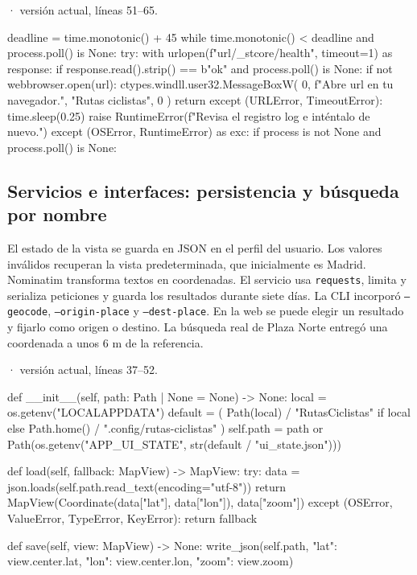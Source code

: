 \documentclass[11pt,a4paper]{article}
\begin{document}
\smallskip
{\footnotesize\texttt{} · versión actual, líneas 51--65.}\par
\begin{Codigo}[firstnumber=51]
        deadline = time.monotonic() + 45
        while time.monotonic() < deadline and process.poll() is None:
            try:
                with urlopen(f"{url}/_stcore/health", timeout=1) as response:
                    if response.read().strip() == b"ok" and process.poll() is None:
                        if not webbrowser.open(url):
                            ctypes.windll.user32.MessageBoxW(
                                0, f"Abre {url} en tu navegador.", "Rutas ciclistas", 0
                            )
                        return
            except (URLError, TimeoutError):
                time.sleep(0.25)
        raise RuntimeError(f"Revisa el registro {log} e inténtalo de nuevo.")
    except (OSError, RuntimeError) as exc:
        if process is not None and process.poll() is None:
\end{Codigo}

\subsection{Servicios e interfaces: persistencia y búsqueda por nombre}
El estado de la vista se guarda en JSON en el perfil del usuario. Los valores inválidos recuperan la vista predeterminada, que inicialmente es Madrid. Nominatim transforma textos en coordenadas. El servicio usa \texttt{requests}, limita y serializa peticiones y guarda los resultados durante siete días. La CLI incorporó \texttt{--geocode}, \texttt{--origin-place} y \texttt{--dest-place}. En la web se puede elegir un resultado y fijarlo como origen o destino. La búsqueda real de Plaza Norte entregó una coordenada a unos 6 m de la referencia.

\smallskip
{\footnotesize\texttt{} · versión actual, líneas 37--52.}\par
\begin{Codigo}[firstnumber=37]
    def __init__(self, path: Path | None = None) -> None:
        local = os.getenv("LOCALAPPDATA")
        default = (
            Path(local) / "RutasCiclistas" if local else Path.home() / ".config/rutas-ciclistas"
        )
        self.path = path or Path(os.getenv("APP_UI_STATE", str(default / "ui_state.json")))

    def load(self, fallback: MapView) -> MapView:
        try:
            data = json.loads(self.path.read_text(encoding="utf-8"))
            return MapView(Coordinate(data["lat"], data["lon"]), data["zoom"])
        except (OSError, ValueError, TypeError, KeyError):
            return fallback

    def save(self, view: MapView) -> None:
        write_json(self.path, {"lat": view.center.lat, "lon": view.center.lon, "zoom": view.zoom})
\end{Codigo}
\end{document}
